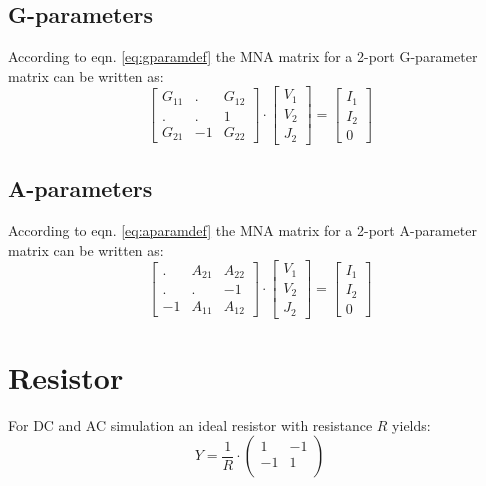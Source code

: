\subsection{G-parameters}

According to eqn. \eqref{eq:gparamdef} the MNA matrix for a 2-port
G-parameter matrix can be written as:
\begin{equation}
\begin{bmatrix}
 G_{11} & .  &  G_{12} \\
 . & . & 1 \\
 G_{21} & -1 & G_{22}
\end{bmatrix}
\cdot
\begin{bmatrix}
V_{1}\\
V_{2}\\
J_{2}
\end{bmatrix}
=
\begin{bmatrix}
I_{1}\\
I_{2}\\
0
\end{bmatrix}
\end{equation}

\subsection{A-parameters}

According to eqn. \eqref{eq:aparamdef} the MNA matrix for a 2-port
A-parameter matrix can be written as:
\begin{equation}
\begin{bmatrix}
 . & A_{21}  &  A_{22} \\
 . & . & -1 \\
 -1 & A_{11} & A_{12}
\end{bmatrix}
\cdot
\begin{bmatrix}
V_{1}\\
V_{2}\\
J_{2}
\end{bmatrix}
=
\begin{bmatrix}
I_{1}\\
I_{2}\\
0
\end{bmatrix}
\end{equation}

\section{Resistor}

For DC and AC simulation an ideal resistor with resistance $R$
yields:
\begin{equation}
Y = \dfrac{1}{R} \cdot
\begin{pmatrix}
 1 & -1 \\
-1 &  1 \\
\end{pmatrix}
\end{equation}

